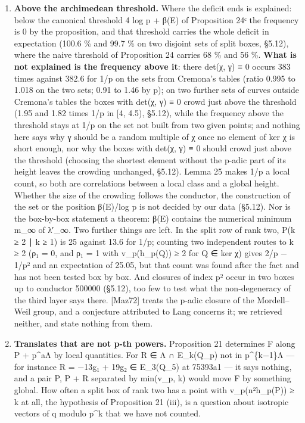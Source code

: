 \documentclass[11pt,a4paper]{article}
\theoremstyle{named}
\begin{document}
\begin{enumerate}[leftmargin=1.4em,itemsep=.2em,topsep=.3em]
\item \textbf{Above the archimedean threshold.} Where the deficit ends is explained: below the canonical threshold 4 log p + β(E) of Proposition 24ᶜ the frequency is 0 by the proposition, and that threshold carries the whole deficit in expectation (100.6 \% and 99.7 \% on two disjoint sets of split boxes, §5.12), where the naive threshold of Proposition 24 carries 68 \% and 56 \%. \textbf{What is not explained is the frequency above it}: there det(χ, γ) ≡ 0 occurs 383 times against 382.6 for 1/p on the sets from Cremona's tables (ratio 0.995 to 1.018 on the two sets; 0.91 to 1.46 by p); on two further sets of curves outside Cremona's tables the boxes with det(χ, γ) ≡ 0 crowd just above the threshold (1.95 and 1.82 times 1/p in [4, 4.5), §5.12), while the frequency above the threshold stays at 1/p on the set not built from two given points; and nothing here says why γ should be a random multiple of χ once no element of ker χ is short enough, nor why the boxes with det(χ, γ) ≡ 0 should crowd just above the threshold (choosing the shortest element without the p-adic part of its height leaves the crowding unchanged, §5.12). Lemma 25 makes 1/p a local count, so both are correlations between a local class and a global height. Whether the size of the crowding follows the conductor, the construction of the set or the position β(E)/log p is not decided by our data (§5.12). Nor is the box-by-box statement a theorem: β(E) contains the numerical minimum m\_∞ of λ′\_∞. Two further things are left. In the split row of rank two, P(k ≥ 2 ∣ k ≥ 1) is 25 against 13.6 for 1/p; counting two independent routes to k ≥ 2 (ρ₁ = 0, and ρ₁ = 1 with v\_p(h\_p(Q)) ≥ 2 for Q ∈ ker χ) gives 2/p − 1/p² and an expectation of 25.05, but that count was found after the fact and has not been tested box by box. And closures of index p² occur in two boxes up to conductor 500000 (§5.12), too few to test what the non-degeneracy of the third layer says there. [Maz72] treats the p-adic closure of the Mordell–Weil group, and a conjecture attributed to Lang concerns it; we retrieved neither, and state nothing from them.
\item \textbf{Translates that are not p-th powers.} Proposition 21 determines F along P + p\textasciicircum{}aΛ by local quantities. For R ∈ Λ ∩ E\_k(Q\_p) not in p\textasciicircum{}\{k−1\}Λ — for instance R = −13g₁ + 19g₂ ∈ E\_3(Q\_5) at 75393a1 — it says nothing, and a pair P, P + R separated by min(v\_p, k) would move F by something global. How often a split box of rank two has a point with v\_p(n²h\_p(P)) ≥ k at all, the hypothesis of Proposition 21 (iii), is a question about isotropic vectors of q modulo p\textasciicircum{}k that we have not counted.
\end{enumerate}
\end{document}
